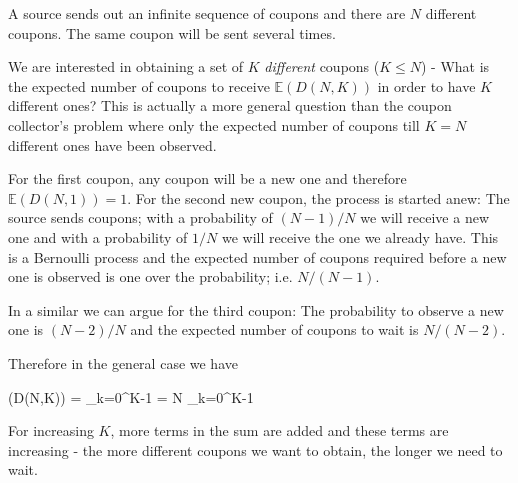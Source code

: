 

A source sends out an infinite sequence of coupons and there are \(N\)
different coupons. The same coupon will be sent several times.

We are interested in obtaining a set of \(K\) \emph{different} coupons
(\(K \leq N\)) - What is the expected number of coupons to receive
\(\mathbb{E}(D(N,K))\) in order to have \(K\) different ones? This is
actually a more general question than the coupon collector's problem
where only the expected number of coupons till \(K=N\) different ones
have been observed.

For the first coupon, any coupon will be a new one and therefore
\(\mathbb{E}(D(N,1)) = 1\). For the second new coupon, the process is
started anew: The source sends coupons; with a probability of
\((N-1)/N\) we will receive a new one and with a probability of \(1/N\)
we will receive the one we already have. This is a Bernoulli process and
the expected number of coupons required before a new one is observed is
one over the probability; i.e. \(N/(N-1)\).

In a similar we can argue for the third coupon: The probability to
observe a new one is \((N-2)/N\) and the expected number of coupons to
wait is \(N/(N-2)\).

Therefore in the general case we have

\bee
{}(D(N,K)) = \sum_{k=0}^{K-1}  = N \sum_{k=0}^{K-1} 
\eee

For increasing \(K\), more terms in the sum are added and these terms
are increasing - the more different coupons we want to obtain, the
longer we need to wait.
